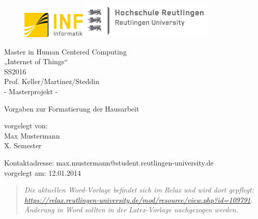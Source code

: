 \begin{titlepage}

\begin{center}

\begin{figure}
\begin{minipage}[H]{4cm}
\centering
\includegraphics[width=0.8\linewidth]{Bilder/Deckblatt/UniversityLogo}
\end{minipage}
\hfill
\begin{minipage}[H]{6cm}
\centering
\includegraphics[width=1\linewidth]{Bilder/Deckblatt/CompanyLogo}
\end{minipage}
\end{figure}

\vspace*{0.8cm}

Master in Human Centered Computing\\
„Internet of Things“ \\
\vspace*{0.2cm}
SS2016\\
\vspace*{0.4cm}
Prof. Keller/Martinez/Steddin\\
\vspace*{0.8cm}
- Masterprojekt -

{\huge Vorgaben zur Formatierung der
Hausarbeit }\\

\vspace*{1.5cm}

vorgelegt von:\\
Max Mustermann\\
X. Semester 

\vspace*{0.5cm}

Kontaktadresse: 	max.mustermann@student.reutlingen-university.de\\
vorgelegt am:	12.01.2014

\end{center}


\begin{abstract}
\textit{Die aktuellen Word-Vorlage befindet sich im Relax und wird dort gepflegt: \url{https://relax.reutlingen-university.de/mod/resource/view.php?id=109791}. Änderung in Word sollten in der  Latex-Vorlage nachgezogen werden.}
\end{abstract}

\end{titlepage}